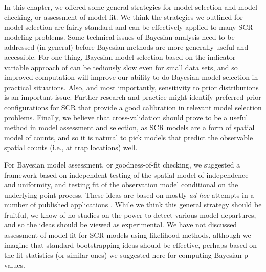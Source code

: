 {In this chapter, we offered some general strategies for model
selection and model checking, or assessment of model fit.  We think
the strategies we outlined for model selection are fairly standard
and can be effectively applied to many SCR modeling problems.
Some technical issues of Bayesian analysis need to be addressed (in
general) before Bayesian methods are more generally useful and
accessible.  For one thing, Bayesian model selection based on the
indicator variable approach of \citet{kuo_mallick:1998} can be
tediously slow even for small data sets, and so improved computation
will improve our ability to do Bayesian model selection in practical
situations.  Also, and most importantly, sensitivity to prior
distributions is an important issue. Further research and practice
might identify preferred prior configurations for SCR that provide a
good calibration in relevant model selection problems.
Finally, we believe that 
cross-validation should prove to be a useful method in model
assessment and selection, 
as SCR models are a form of spatial model of counts, and so it is
natural to pick models that predict the observable spatial counts
(i.e., at trap locations) well.

For Bayesian model assessment, or goodness-of-fit checking, we
suggested a framework based on independent testing of the spatial
model of independence and uniformity, and testing fit of the
observation model conditional on the underlying point process.  These
ideas are based on mostly {\it ad hoc} attempts in a number of
published applications \citep[e.g.,]{royle_etal:2009ecol,
  royle_etal:2011mee, gopalaswamy_etal:2012ecol, russell_etal:2012}.
While we think this general strategy should be fruitful, we know of no
studies on the power to detect various model departures, and so the
ideas should be viewed as experimental. We have not discussed
assessment of model fit for SCR models using likelihood methods,
although we imagine that standard bootstrapping ideas should be
effective, perhaps based on the fit statistics (or similar ones) we
suggested here for computing Bayesian p-values.

}
